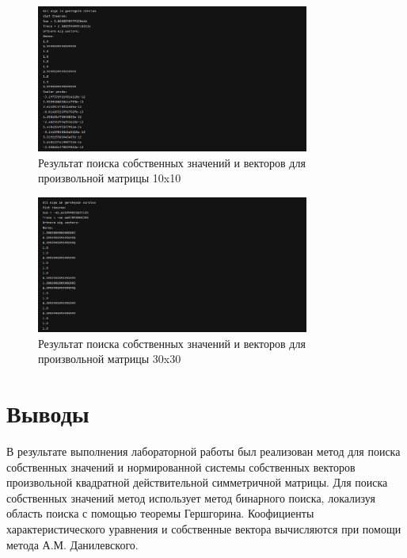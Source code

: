 \documentclass[a4paper, 14pt]{extarticle}
\begin{document}
\begin{figure}[H]
\centering
\includegraphics[width=0.8\textwidth]{images/res2.png}
\caption{Результат поиска собственных значений и векторов для произвольной матрицы 10x10}
\label{fig:img2}
\end{figure}


\begin{figure}[H]
\centering
\includegraphics[width=0.8\textwidth]{images/res3.png}
\caption{Результат поиска собственных значений и векторов для произвольной матрицы 30x30}
\label{fig:img3}
\end{figure}


\section{Выводы}
В результате выполнения лабораторной работы был реализован метод для поиска собственных значений и нормированной системы собственных векторов произвольной квадратной действительной симметричной матрицы. Для поиска собственных значений метод использует метод бинарного поиска, локализуя область поиска с помощью теоремы Гершгорина. Коофициенты характеристического уравнения и собственные вектора вычисляются при помощи метода А.М. Данилевского.
\end{document}
